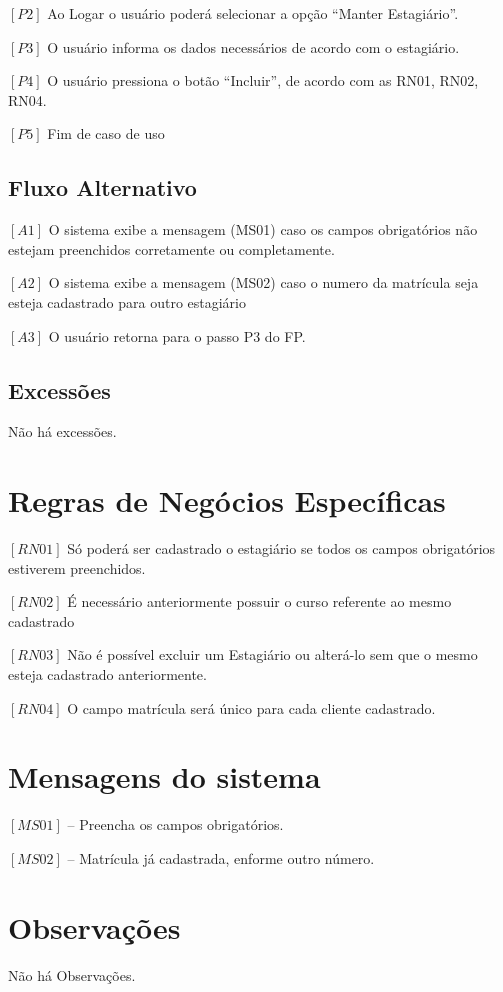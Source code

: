 \textbf{$[P2]$} Ao Logar o usuário poderá selecionar a opção “Manter Estagiário”.

\textbf{$[P3]$} O usuário informa os dados necessários de acordo com o estagiário.

\textbf{$[P4]$} O usuário pressiona o botão “Incluir”, de acordo com as RN01, RN02, RN04.

\textbf{$[P5]$} Fim de caso de uso

\subsection{Fluxo Alternativo}

$[A1]$ O sistema exibe a mensagem (MS01) caso os campos obrigatórios não estejam preenchidos
corretamente ou completamente.

$[A2]$ O sistema exibe a mensagem (MS02) caso o numero da matrícula seja esteja cadastrado para
outro estagiário

$[A3]$ O usuário retorna para o passo P3 do FP.

\subsection{Excessões}

Não há excessões.

\section{Regras de Negócios Específicas}

$[RN01]$ Só poderá ser cadastrado o estagiário se todos os campos obrigatórios estiverem
preenchidos.

$[RN02]$ É necessário anteriormente possuir o curso referente ao mesmo cadastrado

$[RN03]$ Não é possível excluir um Estagiário ou alterá-lo sem que o mesmo esteja
cadastrado anteriormente.

$[RN04]$ O campo matrícula será único para cada cliente cadastrado.


\section{Mensagens do sistema}

$[MS01]$ – Preencha os campos obrigatórios.

$[MS02]$ – Matrícula já cadastrada, enforme outro número.

\section{Observações}

Não há Observações.

